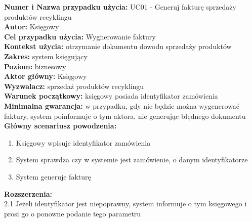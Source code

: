 \textbf{Numer i Nazwa przypadku użycia:} UC01 - Generuj fakturę sprzedaży produktów recyklingu \\
\textbf{Autor:} Księgowy\\
\textbf{Cel przypadku użycia:} Wygnerowanie faktury \\
\textbf{Kontekst użycia:} otrzymanie dokumentu dowodu sprzedaży produktów  \\
\textbf{Zakres:} system księgujący \\
\textbf{Poziom:} biznesowy \\
\textbf{Aktor główny:} Księgowy \\
\textbf{Wyzwalacz:} sprzedaż produktów recyklingu \\
\textbf{Warunek początkowy:} księgowy posiada identyfikator zamówienia \\
\textbf{Minimalna gwarancja:} w przypadku, gdy nie będzie można wygenerować faktury, system poinformuje o tym aktora, nie generując błędnego dokumentu \\
\textbf{Główny scenariusz powodzenia:} 
	\begin{enumerate}
		\item Księgowy wpisuje identyfikator zamówienia
		\item System sprawdza czy w systemie jest zamówienie, o danym identyfikatorze
		\item System generuje fakturę 
	\end{enumerate}
\textbf{Rozszerzenia:} \\
2.1 Jeżeli identyfikator jest niepoprawny, system informuje o tym księgowego i prosi go o ponowne podanie tego parametru

